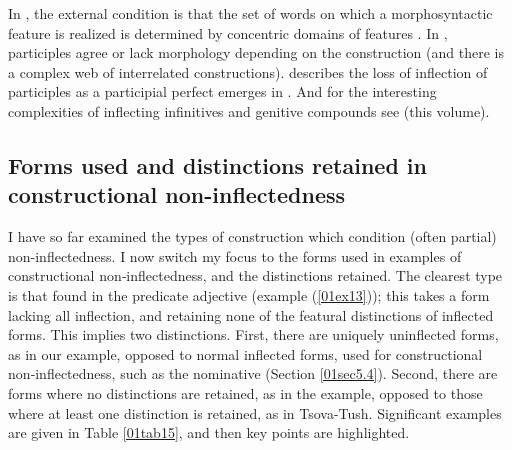 \documentclass[output=paper,colorlinks,citecolor=brown]{langscibook}
\begin{document}
In , the external condition is that the set of words on which a morphosyntactic feature is realized is determined by concentric domains of features \citep[78--84]{round2013}. In  \citet{arkadiev2013, arkadiev2020}, participles agree or lack  morphology depending on the construction (and there is a complex web of interrelated constructions). \citet{giger2016} describes the loss of inflection of participles as a participial perfect emerges in . And for the interesting complexities of  inflecting infinitives and  genitive compounds see \citeauthor{spencer2025} (this volume).

\subsection{Forms used and distinctions retained in constructional non-inflectedness} \label{01sec5.5}

I have so far examined the types of construction which condition (often partial) non-inflectedness. I now switch my focus to the forms used in examples of constructional non‑inflectedness, and the distinctions retained. The clearest type is that found in the  predicate adjective (example (\ref{01ex13})); this takes a form lacking all inflection, and retaining none of the featural distinctions of inflected forms. This implies two distinctions. First, there are uniquely uninflected forms, as in our  example, opposed to normal inflected forms, used for constructional non‑inflectedness, such as the  nominative (Section \ref{01sec5.4}). Second, there are forms where no distinctions are retained, as in the  example, opposed to those where at least one distinction is retained, as in Tsova-Tush. Significant examples are given in Table \ref{01tab15}, and then key points are highlighted.
\end{document}

